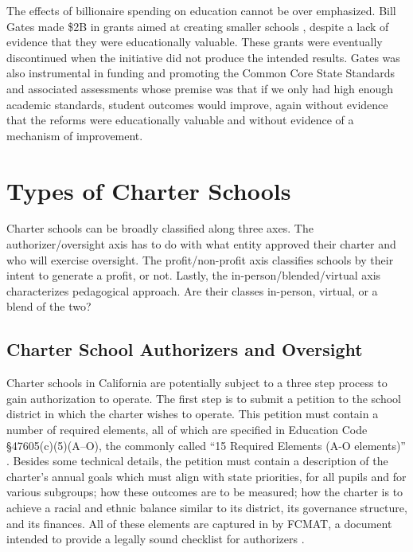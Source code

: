 The effects of billionaire spending on education cannot be over emphasized. Bill Gates made \$2B in grants aimed at creating smaller schools \parencite[11]{Gates2009}, despite a lack of evidence that they were educationally valuable. These grants were eventually discontinued when the initiative did not produce the intended results. Gates was also instrumental in funding and promoting the Common Core State Standards and associated assessments whose premise was that if we only had high enough academic standards, student outcomes would improve, again without evidence that the reforms were educationally valuable and without evidence of a mechanism of improvement.

\section{Types of Charter Schools}\label{sec:types-charters}\indent

Charter schools can be broadly classified along three axes. The authorizer/oversight axis has to do with what entity approved their charter and who will exercise oversight. The profit/non-profit axis classifies schools by their intent to generate a profit, or not.
Lastly, the in-person/blended/virtual axis characterizes pedagogical approach. Are their classes in-person, virtual, or a blend of the two?

\subsection{Charter School Authorizers and Oversight}\indent

Charter schools in California are potentially subject to a three step process to gain authorization to operate. The first step is to submit a petition to the school district in which the charter wishes to operate. This petition must contain a number of required elements, all of which are specified in Education Code §47605(c)(5)(A–O), the commonly called ``15 Required Elements (A-O elements)'' \parencite[89]{Aguinaldo.etal2021}. Besides some technical details, the petition must contain a description of the charter's annual goals which must align with state priorities, for all pupils and for various subgroups; how these outcomes are to be measured; how the charter is to achieve a racial and ethnic balance similar to its district, its governance structure, and its finances. All of these elements are captured in \textit{} by FCMAT, a document intended to provide a legally sound checklist for authorizers \parencite{FCMAT2022}.  %

